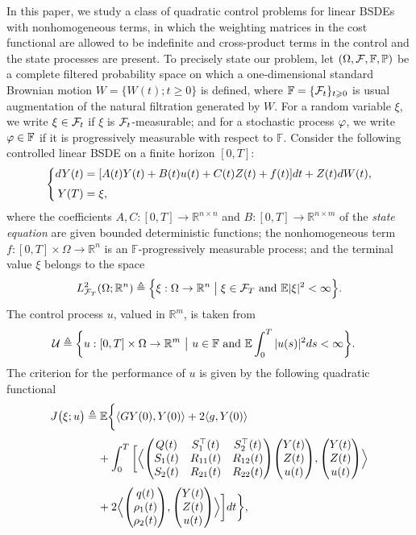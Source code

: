 \documentclass[11pt,times,twoside]{article}
\def\dbE{\mathbb{E}} \def\sE{\mathscr{E}} \def\fE{\mathfrak{E}} \def\cE{{\cal E}} \def\BE{{\bf E}} \def\Be{{\bf e}}
\def\dbF{\mathbb{F}} \def\sF{\mathscr{F}} \def\fF{\mathfrak{F}} \def\cF{{\cal F}} \def\BF{{\bf F}} \def\Bf{{\bf f}}
\def\dbP{\mathbb{P}} \def\sP{\mathscr{P}} \def\fP{\mathfrak{P}} \def\cP{{\cal P}} \def\BP{{\bf P}} \def\Bp{{\bf p}}
\def\dbR{\mathbb{R}} \def\sR{\mathscr{R}} \def\fR{\mathfrak{R}} \def\cR{{\cal R}} \def\BR{{\bf R}} \def\Br{{\bf r}}
\def\Om{\Omega}      \def\Lm{\Lambda}     \def\Th{\Theta}
\def\ss{\smallskip}       \def\ua{\mathop{\uparrow}}         \def\lt{\left}
\def\ra{\rightarrow}      \def\la{\leftarrow}                \def\lra{\longrightarrow} \def\lla{\longleftarrow}  \def\ds{\displaystyle}             \def\ns{\noalign{\ss}}
\def\ts{\times}           \def\qq{\qquad}                    \def\rran{\right\rangle}
\def\ges{\geqslant}       \def\esssup{\mathop{\rm esssup}}   \def\[{\Big[}
\def\bel{\begin{equation}\label}      \def\ee{\end{equation}}
\def\ba{\begin{aligned}}              \def\ea{\end{aligned}}
\begin{document}
In this paper, we study a class of quadratic control problems for linear BSDEs with nonhomogeneous terms,
in which the weighting matrices in the cost functional are allowed to be indefinite and cross-product terms
in the control and the state processes are present.
To precisely state our problem, let $(\Omega,\cF,\dbF,\dbP)$ be a complete filtered probability space on which
a one-dimensional standard Brownian motion $W=\{W(t);t\ges0\}$ is defined, where $\dbF=\{\cF_t\}_{t\ges0}$
is usual augmentation of the natural filtration generated by $W$.
For a random variable $\xi$, we write $\xi\in\cF_t$ if $\xi$ is $\cF_t$-measurable;
and for a stochastic process $\varphi$, we write $\f\in\dbF$ if it is progressively measurable with respect to $\dbF$.
Consider the following controlled linear BSDE on a finite horizon $[0,T]$:
%
\bel{state}\left\{\ba
\ds dY(t) &= [A(t)Y(t)+B(t)u(t)+C(t)Z(t)+f(t)]dt+Z(t)dW(t),  \\
\ns\ds Y(T) &= \xi,
\ea\right.\ee
%
where the coefficients $A,C:[0,T]\ra\dbR^{n\ts n}$ and $B:[0,T]\ra\dbR^{n\ts m}$ of the {\it state equation}
 are given bounded deterministic functions; the nonhomogeneous term $f:[0,T]\ts\Om\ra\dbR^{n}$ is an $\dbF$-progressively
measurable process; and the terminal value $\xi$ belongs to the space
%
$$L^2_{\cF_T}(\Om;\dbR^n)\deq\Big\{\xi:\Om\to\dbR^n\bigm|\xi\in\cF_T  \text{ and }\dbE|\xi|^2<\i\Big\}.$$
%
The control process $u$, valued in $\dbR^m$, is taken from
%
\begin{align*}
  \cU\deq \bigg\{u:[0,T]\ts\Om\rightarrow\dbR^{m}~\big|&~u\in\dbF \text{ and } \dbE\int_0^T|u(s)|^2ds<\i \bigg\}.
\end{align*}
%
The criterion for the performance of $u$ is given by the following quadratic functional
%
\begin{equation}\label{cost}
\begin{aligned}
\ds J\big(\xi;u\big) &\deq\dbE\bigg\{\lan GY(0),Y(0)\ran+2\lan g,Y(0)\ran \\
%
\ns\ds &\hp{=\ } +\int_0^T\bigg[
\Blan\begin{pmatrix}Q(t)&S_1^\top(t)&S_2^\top(t)\\S_1(t)&R_{11}(t)&R_{12}(t)\\S_2(t)&R_{21}(t)&R_{22}(t) \end{pmatrix}\!
\begin{pmatrix}Y(t)\\Z(t)\\u(t)\end{pmatrix}\!,
\begin{pmatrix}Y(t)\\Z(t)\\u(t)\end{pmatrix}\Bran \\
%
\ns\ds &\hp{=\ } +2\Blan\begin{pmatrix}q(t)\\ \rho_1(t)\\ \rho_2(t) \end{pmatrix}\!,
   \begin{pmatrix}Y(t)\\Z(t)\\u(t)\end{pmatrix}\Bran\bigg] dt\bigg\},
%
\end{aligned}
\end{equation}
\end{document}
